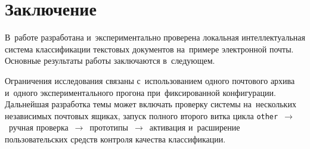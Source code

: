 \chapter*{Заключение}                       %


В~работе разработана и~экспериментально проверена локальная интеллектуальная
система классификации текстовых документов на~примере электронной почты.
Основные результаты работы заключаются в~следующем.


Ограничения исследования связаны с~использованием одного почтового архива
и~одного экспериментального прогона при~фиксированной конфигурации. Дальнейшая
разработка темы может включать проверку системы на~нескольких независимых
почтовых ящиках, запуск полного второго витка цикла
\texttt{other}~$\to$~ручная проверка~$\to$~прототипы~$\to$~активация
и~расширение пользовательских средств контроля качества классификации.
